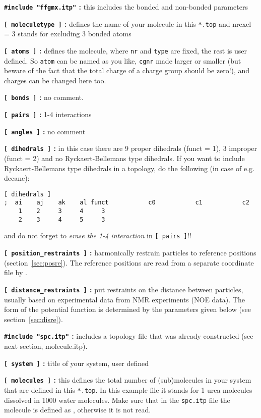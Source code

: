 {\bf \verb'#include "ffgmx.itp"' :} this includes the bonded and
non-bonded {\gromacs} parameters

{\bf \verb'[ moleculetype ]' :} defines the name of your molecule in this
\verb'*.top' and nrexcl = 3 stands for excluding 3 bonded atoms

{\bf \verb'[ atoms ]' :} defines the molecule, where {\tt nr} and {\tt type}
are fixed, the rest is user defined. So {\tt atom} can be named as you
like, {\tt cgnr} made larger or smaller (but beware of the fact that
the total charge of a charge group should be zero!), and charges can
be changed here too.

{\bf \verb'[ bonds ]' :} no comment.

{\bf \verb'[ pairs ]' :} 1-4 interactions

{\bf \verb'[ angles ]' :} no comment

{\bf \verb'[ dihedrals ]' :} in this case there are 9 proper dihedrals
(funct = 1), 3 improper (funct = 2) and no Ryckaert-Bellemans type
dihedrals. If you want to include Ryckaert-Bellemans type dihedrals
in a topology, do the following (in case of e.g. decane):
\begin{verbatim}
[ dihedrals ]
;  ai    aj    ak    al funct           c0           c1           c2
    1    2     3     4     3 
    2    3     4     5     3
\end{verbatim}
and do not forget to {\em erase the 1-4 interaction} 
in \verb'[ pairs ]'!!

{\bf \verb'[ position_restraints ]' :} harmonically restrain particles
to reference positions (section~\ref{sec:posre}). 
The reference positions are read from a 
separate coordinate file by .

{\bf \verb'[ distance_restraints ]' :} put restraints on the distance 
between particles, usually based on experimental data from NMR experiments
(NOE data). The form of the potential function is determined by the
parameters given below (see section~\ref{sec:disre}).

{\bf \verb'#include "spc.itp"' :} includes a topology file that was already
constructed (see next section, molecule.itp).

{\bf \verb'[ system ]' :} title of your system, user defined

{\bf \verb'[ molecules ]' :} this defines the total number of (sub)molecules
in your system that are defined in this \verb'*.top'. In this
example file it stands for 1 urea molecules dissolved in 1000 water
molecules. Make sure that in the \verb'spc.itp' file the molecule is
defined as , otherwise it is not read.

